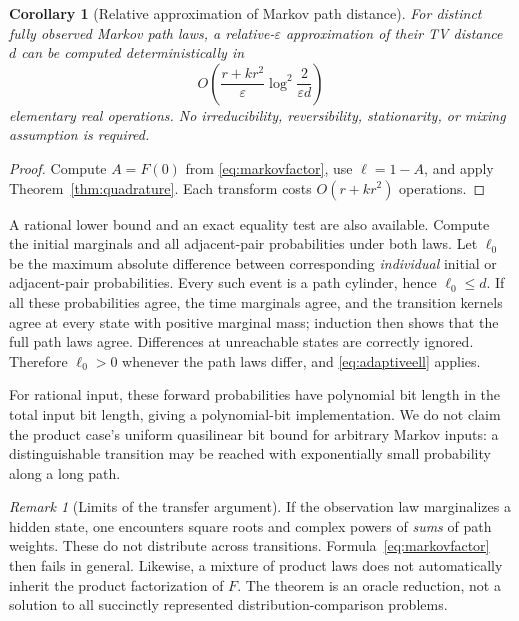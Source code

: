 \documentclass[11pt]{article}
\newtheorem{corollary}[theorem]{Corollary}
\theoremstyle{definition}
\theoremstyle{remark}
\newtheorem{remark}[theorem]{Remark}
\newcommand{\eps}{\varepsilon}
\begin{document}
\begin{corollary}[Relative approximation of Markov path distance]
\label{cor:markov}
For distinct fully observed Markov path laws, a relative-$\eps$ approximation of their TV distance $d$ can be computed deterministically in
\begin{equation}
 O\!\left(\frac{r+kr^2}{\eps}\log^2\frac{2}{\eps d}\right)
 \label{eq:markovcost}
\end{equation}
elementary real operations. No irreducibility, reversibility, stationarity, or mixing assumption is required.
\end{corollary}
\begin{proof}
Compute $A=F(0)$ from \eqref{eq:markovfactor}, use $\ell=1-A$, and apply Theorem~\ref{thm:quadrature}. Each transform costs $O(r+kr^2)$ operations.
\end{proof}

A rational lower bound and an exact equality test are also available. Compute the initial marginals and all adjacent-pair probabilities under both laws. Let $\ell_0$ be the maximum absolute difference between corresponding \emph{individual} initial or adjacent-pair probabilities. Every such event is a path cylinder, hence $\ell_0\le d$. If all these probabilities agree, the time marginals agree, and the transition kernels agree at every state with positive marginal mass; induction then shows that the full path laws agree. Differences at unreachable states are correctly ignored. Therefore $\ell_0>0$ whenever the path laws differ, and \eqref{eq:adaptiveell} applies.

For rational input, these forward probabilities have polynomial bit length in the total input bit length, giving a polynomial-bit implementation. We do not claim the product case's uniform quasilinear bit bound for arbitrary Markov inputs: a distinguishable transition may be reached with exponentially small probability along a long path.

\begin{remark}[Limits of the transfer argument]
If the observation law marginalizes a hidden state, one encounters square roots and complex powers of \emph{sums} of path weights. These do not distribute across transitions. Formula~\eqref{eq:markovfactor} then fails in general. Likewise, a mixture of product laws does not automatically inherit the product factorization of $F$. The theorem is an oracle reduction, not a solution to all succinctly represented distribution-comparison problems.
\end{remark}
\end{document}
